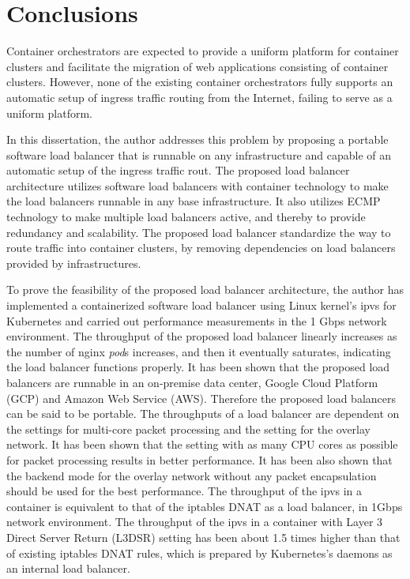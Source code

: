 \section{Conclusions}\label{Conclusions}

Container orchestrators are expected to provide a uniform platform for container clusters and facilitate the migration of web applications consisting of container clusters.
However, none of the existing container orchestrators fully supports an automatic setup of ingress traffic routing from the Internet, failing to serve as a uniform platform.

In this dissertation, the author addresses this problem by proposing a portable software load balancer that is runnable on any infrastructure and capable of an automatic setup of the ingress traffic rout.
The proposed load balancer architecture utilizes software load balancers with container technology to make the load balancers runnable in any base infrastructure.
It also utilizes ECMP technology to make multiple load balancers active, and thereby to provide redundancy and scalability.
The proposed load balancer standardize the way to route traffic into container clusters, by removing dependencies on load balancers provided by infrastructures.

To prove the feasibility of the proposed load balancer architecture, the author has implemented a containerized software load balancer using Linux kernel's ipvs for Kubernetes and carried out performance measurements in the 1 Gbps network environment.
%
The throughput of the proposed load balancer linearly increases as the number of nginx {\em pod}s increases, and then it eventually saturates, indicating the load balancer functions properly.
It has been shown that the proposed load balancers are runnable in an on-premise data center, Google Cloud Platform (GCP) and Amazon Web Service (AWS).
Therefore the proposed load balancers can be said to be portable.
%
The throughputs of a load balancer are dependent on the settings for multi-core packet processing and the setting for the overlay network.
It has been shown that the setting with as many CPU cores as possible for packet processing results in better performance.
It has been also shown that the backend mode for the overlay network without any packet encapsulation should be used for the best performance.
%
The throughput of the ipvs in a container is equivalent to that of the iptables DNAT as a load balancer, in 1Gbps network environment.
The throughput of the ipvs in a container with Layer 3 Direct Server Return (L3DSR) setting has been about 1.5 times higher than that of existing iptables DNAT rules, which is prepared by Kubernetes's daemons as an internal load balancer.

